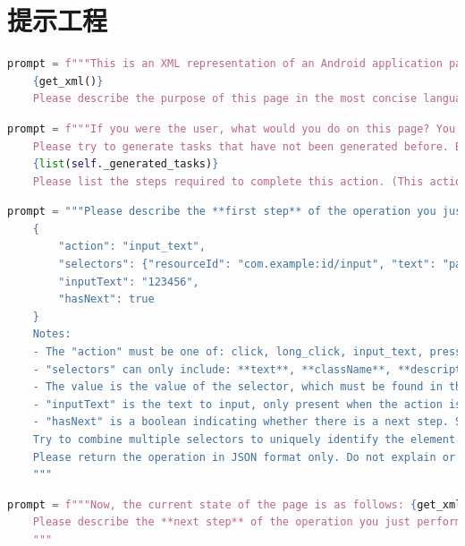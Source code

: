 \documentclass[twocolumn, 10pt]{article}
\begin{document}



\onecolumn
\appendix

\section{提示工程}
\label{sec:prompt}

\begin{lstlisting}[language=Python,caption=意图理解]
    prompt = f"""This is an XML representation of an Android application page:
    {get_xml()}
    Please describe the purpose of this page in the most concise language possible."""
\end{lstlisting}


\begin{lstlisting}[language=python, caption=操作描述]
    prompt = f"""If you were the user, what would you do on this page? You can only describe one action. 
    Please try to generate tasks that have not been generated before. Below are the tasks that have already been generated:
    {list(self._generated_tasks)}
    Please list the steps required to complete this action. (This action will be named 'The Task')"""
\end{lstlisting}


\begin{lstlisting}[language=python, caption=初始事件生成]
    prompt = """Please describe the **first step** of the operation you just performed in JSON format, as shown below:
    {
        "action": "input_text",
        "selectors": {"resourceId": "com.example:id/input", "text": "password"},
        "inputText": "123456",
        "hasNext": true
    }
    Notes:
    - The "action" must be one of: click, long_click, input_text, press_enter
    - "selectors" can only include: **text**, **className**, **description**, **resourceId**, and must be in camelCase. You can not use other selectors.
    - The value is the value of the selector, which must be found in the previous XML
    - "inputText" is the text to input, only present when the action is input_text
    - "hasNext" is a boolean indicating whether there is a next step. Set it to false if there is no next step
    Try to combine multiple selectors to uniquely identify the element.
    Please return the operation in JSON format only. Do not explain or use code blocks.
    """
\end{lstlisting}



\begin{lstlisting}[language=python, caption=后续事件生成]
    prompt = f"""Now, the current state of the page is as follows: {get_xml(self.device.u2)}
    Please describe the **next step** of the operation you just performed in JSON format, using the same format as above.
    """
\end{lstlisting}
\end{document}
